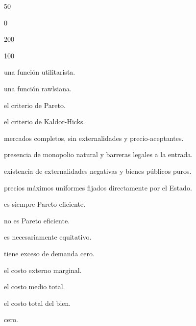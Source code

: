 \begin{opts}
    \item 50
    \item 0
    \item 200
    \item 100
\end{opts}

\begin{opts}
    \item una función utilitarista.
    \item una función rawlsiana.
    \item el criterio de Pareto.
    \item el criterio de Kaldor-Hicks.
\end{opts}

\begin{opts}
    \item mercados completos, sin externalidades y precio-aceptantes.
    \item presencia de monopolio natural y barreras legales a la entrada.
    \item existencia de externalidades negativas y bienes públicos puros.
    \item precios máximos uniformes fijados directamente por el Estado.
\end{opts}

\begin{opts}
    \item es siempre Pareto eficiente.
    \item no es Pareto eficiente.
    \item es necesariamente equitativo.
    \item tiene exceso de demanda cero.
\end{opts}

\begin{opts}
    \item el costo externo marginal.
    \item el costo medio total.
    \item el costo total del bien.
    \item cero.
\end{opts}

